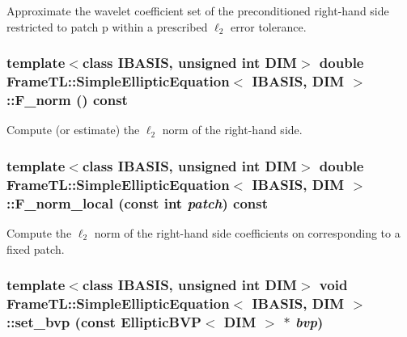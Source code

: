 Approximate the wavelet coefficient set of the preconditioned right-hand side restricted to patch p within a prescribed $\ell_2$ error tolerance. \hypertarget{classFrameTL_1_1SimpleEllipticEquation_ed4364c2a7db00b6c9076290b69147ad}{
\subsubsection[F\_\-norm]{\setlength{\rightskip}{0pt plus 5cm}template$<$class IBASIS, unsigned int DIM$>$ double {\bf FrameTL::SimpleEllipticEquation}$<$ IBASIS, DIM $>$::F\_\-norm () const}}
\label{classFrameTL_1_1SimpleEllipticEquation_ed4364c2a7db00b6c9076290b69147ad}


Compute (or estimate) the $\ell_2$ norm of the right-hand side. \hypertarget{classFrameTL_1_1SimpleEllipticEquation_dc2e6668d1d7f143d1ce1a88e18eddc8}{
\subsubsection[F\_\-norm\_\-local]{\setlength{\rightskip}{0pt plus 5cm}template$<$class IBASIS, unsigned int DIM$>$ double {\bf FrameTL::SimpleEllipticEquation}$<$ IBASIS, DIM $>$::F\_\-norm\_\-local (const int {\em patch}) const}}
\label{classFrameTL_1_1SimpleEllipticEquation_dc2e6668d1d7f143d1ce1a88e18eddc8}


Compute the $\ell_2$ norm of the right-hand side coefficients on corresponding to a fixed patch. \hypertarget{classFrameTL_1_1SimpleEllipticEquation_56298192b4c795a3e2923d3c9175116e}{
\subsubsection[set\_\-bvp]{\setlength{\rightskip}{0pt plus 5cm}template$<$class IBASIS, unsigned int DIM$>$ void {\bf FrameTL::SimpleEllipticEquation}$<$ IBASIS, DIM $>$::set\_\-bvp (const EllipticBVP$<$ DIM $>$ $\ast$ {\em bvp})}}
\label{classFrameTL_1_1SimpleEllipticEquation_56298192b4c795a3e2923d3c9175116e}


